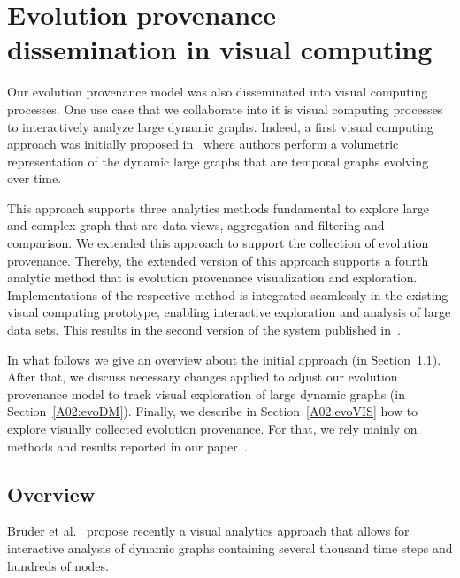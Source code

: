 \section{Evolution provenance dissemination in visual computing}
Our evolution provenance model was also disseminated into visual computing processes.
One use case that we collaborate into it is visual computing processes to interactively analyze large dynamic graphs.
Indeed, a first visual computing approach was initially proposed in~\cite{bruder:18} where authors perform a volumetric representation of the dynamic large graphs that are temporal graphs evolving over time.

This approach supports three analytics methods fundamental to explore large and complex graph that are data views, aggregation and filtering and comparison.
We extended this approach to support the collection of evolution provenance. Thereby, the extended version of this approach supports a fourth analytic method that is evolution provenance visualization and exploration.
Implementations of the respective method is integrated seamlessly in the existing visual computing prototype, enabling interactive exploration and analysis of large data sets. This results in the second version of the system published in~\cite{Bruder2019}.
	
In what follows we give an overview about the initial approach (in Section~\ref{A02:overview}). After that, we discuss necessary changes applied to adjust our evolution provenance model to track visual exploration of large dynamic graphs (in Section~\ref{A02:evoDM}). Finally, we describe in Section~\ref{A02:evoVIS} how to explore visually collected evolution provenance.
For that, we rely mainly on methods and results reported in our paper~\cite{Bruder2019}.
	
	
	
	
			
\subsection{Overview}\label{A02:overview}
	Bruder et al.~\cite{bruder:18} propose recently a visual analytics approach that allows for interactive analysis of dynamic graphs containing several thousand time steps and hundreds of nodes.
	
